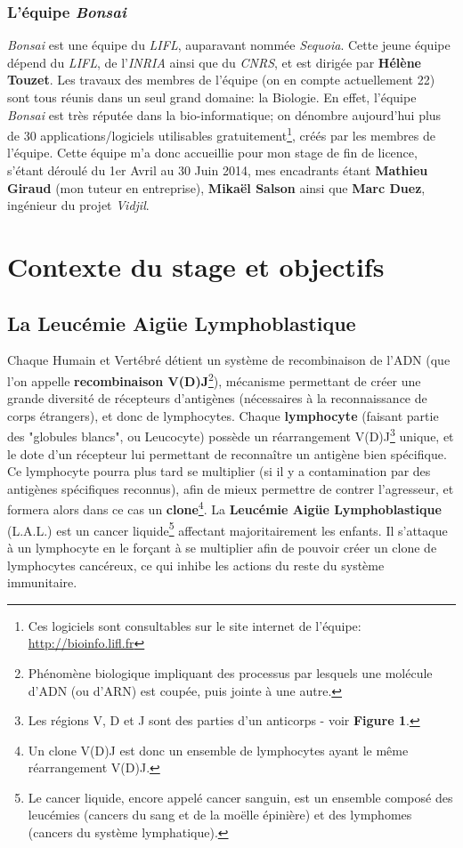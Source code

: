 \documentclass[pdftex,12pt,a4paper]{report}
\begin{document}
\begin{spacing}{1.2}
\subsection{L'équipe \textit{Bonsai}}
\textit{Bonsai} est une équipe du \textit{LIFL}, auparavant nommée \textit{Sequoia}.
Cette jeune équipe dépend du \textit{LIFL}, de l'\textit{INRIA} ainsi que du \textit{CNRS}, et est dirigée par \textbf{Hélène Touzet}.
\newline
Les travaux des membres de l'équipe (on en compte actuellement 22) sont tous réunis dans un seul grand domaine: la Biologie.
En effet, l'équipe \textit{Bonsai} est très réputée dans la bio-informatique; on dénombre aujourd'hui plus de 30 applications/logiciels utilisables gratuitement\footnote{Ces logiciels sont consultables sur le site internet de l'équipe: \url{http://bioinfo.lifl.fr}}, créés par les membres de l'équipe.
\newline
Cette équipe m'a donc accueillie pour mon stage de fin de licence, s'étant déroulé du 1er Avril au 30 Juin 2014, mes encadrants étant \textbf{Mathieu Giraud} (mon tuteur en entreprise), \textbf{Mikaël Salson} ainsi que \textbf{Marc Duez}, ingénieur du projet \textit{Vidjil}.


\chapter{Contexte du stage et objectifs}

\section{La Leucémie Aigüe Lymphoblastique}

Chaque Humain et Vertébré détient un système de recombinaison de l'ADN (que l'on appelle \textbf{recombinaison V(D)J}\footnote{Phénomène biologique impliquant des processus par lesquels une molécule d'ADN (ou d'ARN) est coupée, puis jointe à une autre.}), mécanisme permettant de créer une grande diversité de récepteurs d'antigènes (nécessaires à la reconnaissance de corps étrangers), et donc de lymphocytes.
Chaque \textbf{lymphocyte} (faisant partie des "globules blancs", ou Leucocyte) possède un réarrangement V(D)J\footnote{Les régions V, D et J sont des parties d'un anticorps - voir \textbf{Figure 1}.} unique, et le dote d'un récepteur lui permettant de reconnaître un antigène bien spécifique. Ce lymphocyte pourra plus tard se multiplier (si il y a contamination par des antigènes spécifiques reconnus), afin de mieux permettre de contrer l'agresseur, et formera alors dans ce cas un \textbf{clone}\footnote{Un clone V(D)J est donc un ensemble de lymphocytes ayant le même réarrangement V(D)J.}.
\newline
La \textbf{Leucémie Aigüe Lymphoblastique} (L.A.L.) est un cancer liquide\footnote{Le cancer liquide, encore appelé cancer sanguin, est un ensemble composé des leucémies (cancers du sang et de la moëlle épinière) et des lymphomes (cancers du système lymphatique).} affectant majoritairement les enfants. Il s'attaque à un lymphocyte en le forçant à se multiplier afin de pouvoir créer un clone de lymphocytes cancéreux, ce qui inhibe les actions du reste du système immunitaire.


\end{spacing}
\end{document}
